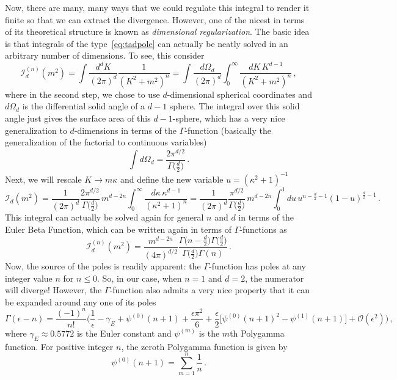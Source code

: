 \documentclass{article}
\numberwithin{equation}{subsection}
\begin{document}
Now, there are many, many ways that we could regulate this integral to render it finite so that we can extract the divergence. However, one of the nicest in terms of its theoretical 
structure is known as \textit{dimensional regularization}. The basic idea is that integrals of the type~\eqref{eq:tadpole} can actually be neatly solved in an arbitrary number of dimensions. 
To see, this consider
\begin{equation}\label{eq:gendInt}
    \mathcal{I}^{(n)}_d(m^2) = \int\frac{d^dK}{(2\pi)^d}\frac{1}{(K^2 + m^2)^n} = \int\frac{d\Omega_d}{(2\pi)^d}\int_0^\infty\frac{dK\,K^{d-1}}{(K^2 + m^2)^n}\,,
\end{equation}
where in the second step, we chose to use $d$-dimensional spherical coordinates and $d\Omega_d$ is the differential solid angle of a $d-1$ sphere. The integral over this solid angle 
just gives the surface area of this $d-1$-sphere, which has a very nice generalization to $d$-dimensions in terms of the $\Gamma$-function (basically the generalization of the 
factorial to continuous variables)
\begin{equation}
    \int d\Omega_d = \frac{2\pi^{d/2}}{\Gamma\big(\frac{d}{2}\big)}\,.
\end{equation}
Next, we will rescale $K\to m \kappa$ and define the new variable $u = (\kappa^2 + 1)^{-1}$
\begin{equation}
    \mathcal{I}_d(m^2) = \frac{1}{(2\pi)^d}\frac{2\pi^{d/2}}{\Gamma\big(\frac{d}{2}\big)}\,m^{d-2n}\int_0^\infty\frac{d\kappa\,\kappa^{d - 1}}{(\kappa^2 + 1)^n} 
	= \frac{1}{(2\pi)^d}\frac{\pi^{d/2}}{\Gamma\big(\frac{d}{2}\big)}\,m^{d-2n}\int_0^1du\,u^{n-\frac{d}{2}-1}(1-u)^{\frac{d}{2}-1}\,.
\end{equation}
This integral can actually be solved again for general $n$ and $d$ in terms of the Euler Beta Function, which can be written again in terms of $\Gamma$-functions as
\begin{equation}
    \mathcal{I}^{(n)}_d(m^2) = \frac{m^{d-2n}}{(4\pi)^{d/2}}\frac{\Gamma\big(n - \frac{d}{2}\big)\Gamma\big(\frac{d}{2}\big)}{\Gamma\big(\frac{d}{2}\big)\Gamma(n)}\,.
\end{equation}
Now, the source of the poles is readily apparent: the $\Gamma$-function has poles at any integer value $n$ for $n\le 0$. So, in our case, when $n = 1$ and $d = 2$, the numerator 
will diverge! However, the $\Gamma$-function also admits a very nice property that it can be expanded around any one of its poles
\begin{equation}
    \Gamma(\epsilon - n) = \frac{(-1)^n}{n!}\Big(\frac{1}{\epsilon}-\gamma_E + \psi^{(0)}(n + 1) + \frac{\epsilon \pi^2}{6} + \frac{\epsilon}{2}\Big[\psi^{(0)}(n + 1)^2 - \psi^{(1)}(n + 1)\Big] + \mathcal{O}(\epsilon^2)\Big)\,,
\end{equation}
where $\gamma_E \approx 0.5772$ is the Euler constant and $\psi^{(m)}$ is the $m$th Polygamma function. For positive integer $n$, the zeroth Polygamma function is given by
\begin{equation}
    \psi^{(0)}(n + 1) = \sum_{m = 1}^n\frac{1}{n}\,.
\end{equation}
\end{document}
